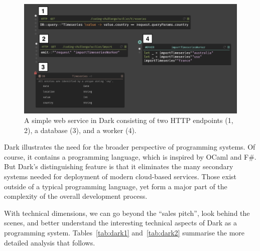 \documentclass[ twoside,openright,titlepage,numbers=noenddot,headinclude,footinclude,cleardoublepage=empty,abstract=on,
                BCOR=5mm,paper=a4,fontsize=11pt
                ]{scrreprt}
\newcommand{\note}[1]{}
\theoremstyle{definition}
\begin{document}
\begin{figure}
  \centering
  \includegraphics[width=1\linewidth]{dark-annotated.png}
  \caption[A simple Web service in Dark]{A simple web service in Dark consisting of two HTTP endpoints (1, 2), a database (3), and a worker (4).\label{fig:dark}}
  \note{FROM https://medium.com/@wilk/dark-lang-an-uncommon-step-towards-the-future-of-programming-921cf7f38baf}
\end{figure}

Dark illustrates the need for the broader perspective of programming
systems. Of course, it contains a programming language, which is
inspired by OCaml and F\#. But Dark's distinguishing feature is that it
eliminates the many secondary systems needed for deployment of modern
cloud-based services. Those exist outside of a typical programming
language, yet form a major part of the complexity of the overall
development process.

With technical dimensions, we can go beyond the ``sales pitch'', look
behind the scenes, and better understand the interesting technical
aspects of Dark as a programming system. Tables~\ref{tab:dark1}
and~\ref{tab:dark2} summarise the more detailed analysis that follows.

\newcommand{\wrap}[1]{\parbox[t]{5.6cm}{#1}}
\renewcommand{\arraystretch}{1.3}
\end{document}

